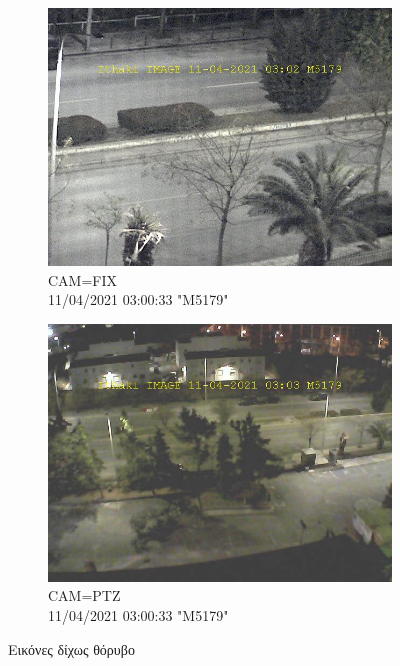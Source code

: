 \documentclass[hidelinks, 12pt, a4paper]{article}
\begin{document}
\begin{figure}[h!]
     \begin{subfigure}[b]{0.5\textwidth}
         \centering
         \includegraphics[keepaspectratio, width=\textwidth]{image_error_free_fix.jpg}
         \caption{CAM=FIX \\ 11/04/2021 03:00:33 "M5179"}
     \end{subfigure}
     \begin{subfigure}[b]{0.5\textwidth}
         \centering
         \includegraphics[keepaspectratio, width=\textwidth]{image_error_free_ptz.jpg}
         \caption{CAM=PTZ \\ 11/04/2021 03:00:33 "M5179"}
     \end{subfigure}
     \caption{Εικόνες δίχως θόρυβο}
\end{figure}
\end{document}
